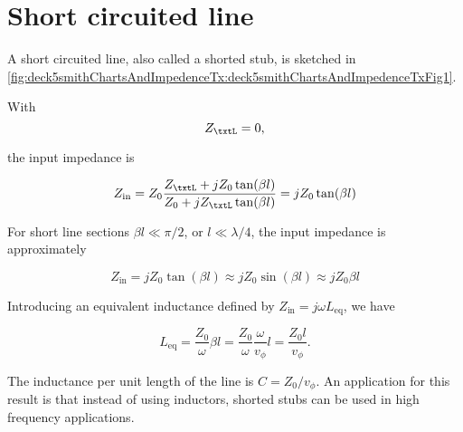%
%

\section{Short circuited line}

A short circuited line, also called a shorted stub, is sketched in \cref{fig:deck5smithChartsAndImpedenceTx:deck5smithChartsAndImpedenceTxFig1}.


With
\begin{equation}\label{eqn:uwavesDeck5SmithChartCore:20}
Z_\txtL = 0,
\end{equation}

the input impedance is

\begin{equation}\label{eqn:uwavesDeck5SmithChartCore:40}
Z_{\textrm{in}}
= Z_0 \frac{ Z_\txtL + j Z_0 \tan(\beta l) }{ Z_0 + j Z_\txtL \tan(\beta l)}
= j Z_0 \tan(\beta l)
\end{equation}

%
%

For short line sections \( \beta l \ll \pi/2 \), or \( l \ll \lambda/4 \), the input impedance is approximately

\begin{dmath}\label{eqn:uwavesDeck5SmithChartCore:80}
Z_{\textrm{in}}
= j Z_0 \tan(\beta l)
\approx j Z_0 \sin(\beta l)
\approx j Z_0 \beta l
\end{dmath}

Introducing an equivalent inductance defined by \( Z_{\textrm{in}} = j \omega L_{\mathrm{eq}} \), we have

\begin{dmath}\label{eqn:uwavesDeck5SmithChartCore:100}
L_{\mathrm{eq}}
=
\frac{Z_0}{\omega} \beta l
=
\frac{Z_0}{\omega} \frac{\omega}{v_\phi} l
=
\frac{Z_0 l}{v_\phi}.
\end{dmath}

The inductance per unit length of the line is \( C = Z_0/v_\phi \).  An application for this result is that instead of using inductors, shorted stubs can be used in high frequency applications.

